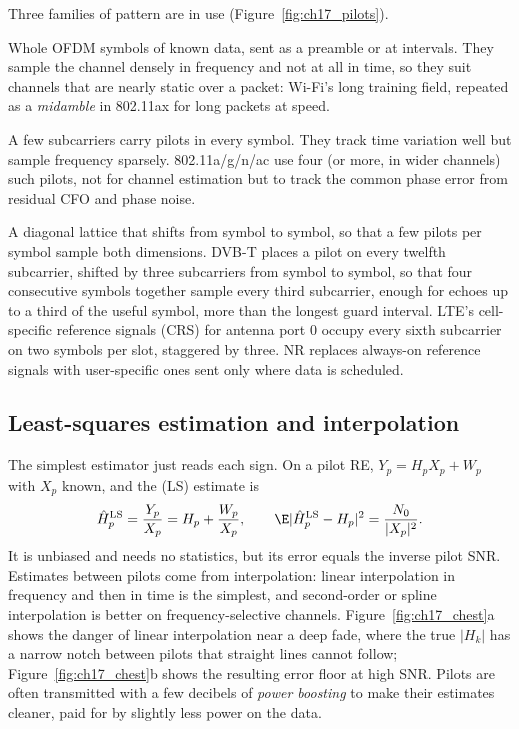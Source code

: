 Three families of pattern are in use (Figure~\ref{fig:ch17_pilots}).
\begin{description}[style=nextline,leftmargin=1.2em,font=\sffamily\bfseries\small\color{navy}]
\item[Block pilots.] Whole OFDM symbols of known data, sent as a preamble or at intervals. They sample the
channel densely in frequency and not at all in time, so they suit channels that are nearly static over a
packet: Wi-Fi's long training field, repeated as a \emph{midamble} in 802.11ax for long packets at speed.
\item[Comb pilots.] A few subcarriers carry pilots in every symbol. They track time variation well but
sample frequency sparsely. 802.11a/g/n/ac use four (or more, in wider channels) such pilots, not for channel
estimation but to track the common phase error from residual CFO and phase noise.
\item[Scattered pilots.] A diagonal lattice that shifts from symbol to symbol, so that a few pilots per
symbol sample both dimensions. DVB-T places a pilot on every twelfth subcarrier, shifted by three subcarriers
from symbol to symbol, so that four consecutive symbols together sample every third subcarrier, enough for
echoes up to a third of the useful symbol, more than the longest guard interval. LTE's cell-specific
reference signals (CRS) for antenna port 0 occupy every sixth subcarrier on two symbols per slot, staggered
by three. NR replaces always-on reference signals with user-specific ones sent only where data is scheduled.
\end{description}

\subsection{Least-squares estimation and interpolation}

The simplest estimator just reads each sign. On a pilot RE, $Y_p=H_pX_p+W_p$ with $X_p$ known, and
the  (LS) estimate is
\begin{equation}
\hat H_p^{\text{LS}}=\frac{Y_p}{X_p}=H_p+\frac{W_p}{X_p},\qquad \E|\hat H_p^{\text{LS}}-H_p|^2=\frac{N_0}{|X_p|^2}.
\end{equation}
It is unbiased and needs no statistics, but its error equals the inverse pilot SNR. Estimates between pilots
come from interpolation: linear interpolation in frequency and then in time is the simplest, and second-order
or spline interpolation is better on frequency-selective channels. Figure~\ref{fig:ch17_chest}a shows the
danger of linear interpolation near a deep fade, where the true $|H_k|$ has a narrow notch between pilots that
straight lines cannot follow; Figure~\ref{fig:ch17_chest}b shows the resulting error floor at high SNR.
Pilots are often transmitted with a few decibels of \emph{power boosting} to make their estimates cleaner,
paid for by slightly less power on the data.

